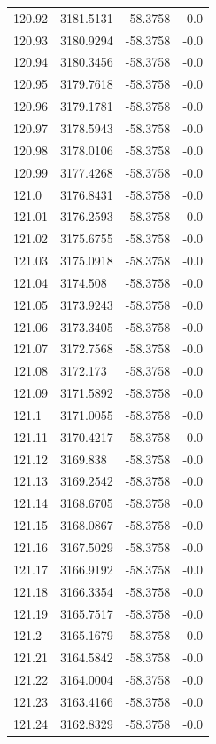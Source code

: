 \begin{table}[H]
\begin{tabular}{llll}
120.92 & 3181.5131 & -58.3758 & -0.0 \\
120.93 & 3180.9294 & -58.3758 & -0.0 \\
120.94 & 3180.3456 & -58.3758 & -0.0 \\
120.95 & 3179.7618 & -58.3758 & -0.0 \\
120.96 & 3179.1781 & -58.3758 & -0.0 \\
120.97 & 3178.5943 & -58.3758 & -0.0 \\
120.98 & 3178.0106 & -58.3758 & -0.0 \\
120.99 & 3177.4268 & -58.3758 & -0.0 \\
121.0 & 3176.8431 & -58.3758 & -0.0 \\
121.01 & 3176.2593 & -58.3758 & -0.0 \\
121.02 & 3175.6755 & -58.3758 & -0.0 \\
121.03 & 3175.0918 & -58.3758 & -0.0 \\
121.04 & 3174.508 & -58.3758 & -0.0 \\
121.05 & 3173.9243 & -58.3758 & -0.0 \\
121.06 & 3173.3405 & -58.3758 & -0.0 \\
121.07 & 3172.7568 & -58.3758 & -0.0 \\
121.08 & 3172.173 & -58.3758 & -0.0 \\
121.09 & 3171.5892 & -58.3758 & -0.0 \\
121.1 & 3171.0055 & -58.3758 & -0.0 \\
121.11 & 3170.4217 & -58.3758 & -0.0 \\
121.12 & 3169.838 & -58.3758 & -0.0 \\
121.13 & 3169.2542 & -58.3758 & -0.0 \\
121.14 & 3168.6705 & -58.3758 & -0.0 \\
121.15 & 3168.0867 & -58.3758 & -0.0 \\
121.16 & 3167.5029 & -58.3758 & -0.0 \\
121.17 & 3166.9192 & -58.3758 & -0.0 \\
121.18 & 3166.3354 & -58.3758 & -0.0 \\
121.19 & 3165.7517 & -58.3758 & -0.0 \\
121.2 & 3165.1679 & -58.3758 & -0.0 \\
121.21 & 3164.5842 & -58.3758 & -0.0 \\
121.22 & 3164.0004 & -58.3758 & -0.0 \\
121.23 & 3163.4166 & -58.3758 & -0.0 \\
121.24 & 3162.8329 & -58.3758 & -0.0 \\

\end{tabular}
\end{table}
